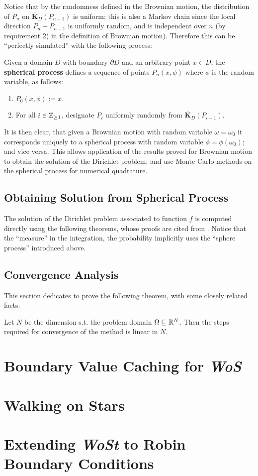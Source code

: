 \documentclass[10pt]{article}
\begin{document}
\textstart
Notice that by the randomness defined in the Brownian motion, the distribution of $P_n$ on $\overline{\bm{K}}_D(P_{n-1})$ is uniform; this is also a Markov chain since the local direction $P_n - P_{n-1}$ is uniformly random, and is independent over $n$ (by requirement 2) in the definition of Brownian motion). Therefore this can be ``perfectly simulated'' with the following process:

\begin{definition}
    Given a domain $D$ with boundary $\partial D$ and an arbitrary point $x \in D$, the \textbf{spherical process} defines a sequence of points $P_n(x, \phi)$ where $\phi$ is the random variable, as follows:
    \begin{enumerate}
        \item $P_0(x, \phi) := x$.
        \item For all $i \in \mathbb{Z}_{\geq 1}$, designate $P_i$ uniformly randomly from $\overline{\bm{K}}_D (P_{i-1})$. 
    \end{enumerate}
\end{definition}

It is then clear, that given a Brownian motion with random variable $\omega = \omega_0$ it corresponds uniquely to a spherical process with random variable $\phi = \phi(\omega_0)$; and vice versa. This allows application of the results proved for Brownian motion to obtain the solution of the Dirichlet problem; and use Monte Carlo methods on the spherical process for numerical quadrature.

\subsection{Obtaining Solution from Spherical Process}

\textstart
The solution of the Dirichlet problem associated to function $f$ is computed directly using the following theorems, whose proofs are cited from \cite{Kakutani1944}. Notice that the ``measure'' in the integration, the probability implicitly uses the ``sphere process'' introduced above.

\subsection{Convergence Analysis}

\textstart
This section dedicates to prove the following theorem, with some closely related facts:

\begin{theorem}
    Let $N$ be the dimension s.t. the problem domain $\Omega \subseteq \mathbb{R}^N$. Then the steps required for convergence of the method is linear in $N$. 
\end{theorem}

\section{Boundary Value Caching for \emph{WoS} \cite{BVCWoS}}

\section{Walking on Stars \cite{WalkOnStars}}

\section{Extending \emph{WoSt} to Robin Boundary Conditions\cite{WalkinRobin}}

\printbibliography
\end{document}

